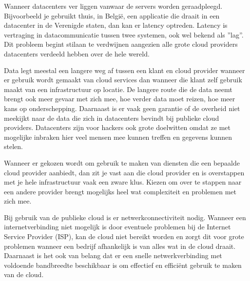 \begin{description}[style=unboxed, labelwidth=\linewidth, listparindent =0pt]
        \item[Latency]
        Wanneer datacenters ver liggen vanwaar de servers worden geraadpleegd. Bijvoorbeeld je gebruikt thuis, in België, een applicatie die draait in een datacenter in de Verenigde staten, dan kan er latency optreden. Latency is vertraging in datacommunicatie tussen twee systemen, ook wel bekend als ''lag''. Dit probleem begint stilaan te verdwijnen aangezien alle grote cloud providers datacenters verdeeld hebben over de hele wereld.
        \newline
        
        \item[Privacy en security]
        Data legt meestal een langere weg af tussen een klant en cloud provider wanneer er gebruik wordt gemaakt van cloud services dan wanneer die klant zelf gebruik maakt van een infrastructuur op locatie. De langere route die de data neemt brengt ook meer gevaar met zich mee, hoe verder data moet reizen, hoe meer kans op onderschepping. Daarnaast is er vaak geen garantie of de overheid niet meekijkt naar de data die zich in datacenters bevindt bij publieke cloud providers. Datacenters zijn voor hackers ook grote doelwitten omdat ze met mogelijke inbraken hier veel mensen mee kunnen treffen en gegevens kunnen stelen.
        \newline
        
        \item [Vendor lock-in]
        Wanneer er gekozen wordt om gebruik te maken van diensten die een bepaalde cloud provider aanbiedt, dan zit je vast aan die cloud provider en is overstappen met je hele infrastructuur vaak een zware klus. Kiezen om over te stappen naar een andere provider brengt mogelijks heel wat complexiteit en problemen met zich mee.
        \newline
        
        
        \item [Afhankelijk van netwerkconnectiviteit]
        Bij gebruik van de publieke cloud is er netwerkconnectiviteit nodig. Wanneer een internetverbinding niet mogelijk is door eventuele problemen bij de Internet Service Provider (ISP), kan de cloud niet bereikt worden en zorgt dit voor grote problemen wanneer een bedrijf afhankelijk is van alles wat in de cloud draait. Daarnaast is het ook van belang dat er een snelle netwerkverbinding met voldoende bandbreedte beschikbaar is om effectief en efficiënt gebruik te maken van de cloud.
        \newline
        

\end{description}
